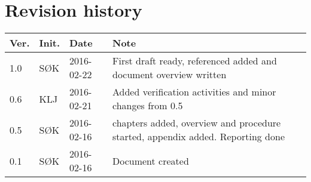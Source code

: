 \chapter*{Revision history}
\label{app:rev_his}

\renewcommand\arraystretch{1.5}
\begin{tabular}{b{1cm} b{1cm} b{2cm} b{8cm}}
    \textbf{Ver.} & \textbf{Init.} & \textbf{Date} & \textbf{Note} \\
    \hline
    1.0 & SØK & 2016-02-22 & First draft ready, referenced added and document overview written \\
    \hline
    0.6 & KLJ & 2016-02-21 & Added verification activities and minor changes from 0.5 \\
    \hline
    0.5 & SØK & 2016-02-16 & chapters added, overview and procedure started, appendix added. Reporting done \\
    \hline
    0.1 & SØK & 2016-02-16 & Document created \\
\end{tabular}
\renewcommand\arraystretch{1}